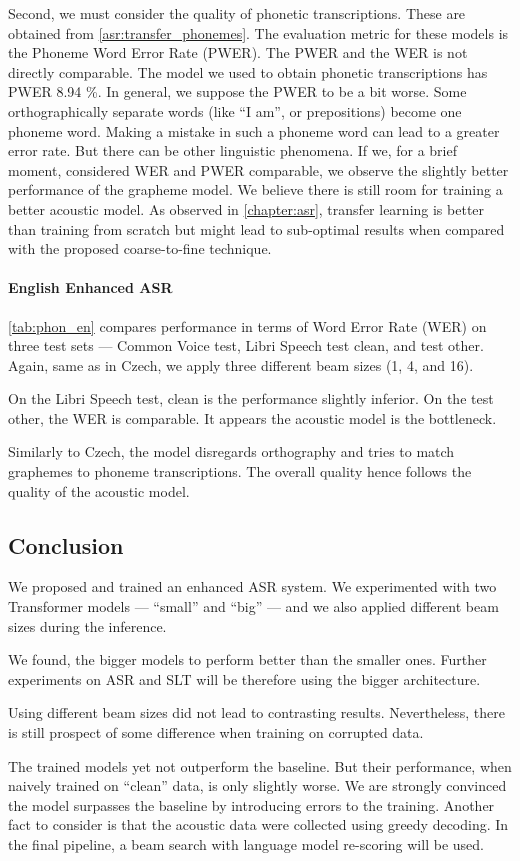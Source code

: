 Second, we must consider the quality of phonetic transcriptions. These are obtained from \cref{asr:transfer_phonemes}. The evaluation metric for these models is the Phoneme Word Error Rate (PWER). The PWER and the WER is not directly comparable. The model we used to obtain phonetic transcriptions has PWER 8.94 \%. In general, we suppose the PWER to be a bit worse. Some orthographically separate words (like ``I am'', or prepositions) become one phoneme word. Making a mistake in such a phoneme word can lead to a greater error rate. But there can be other linguistic phenomena. If we, for a brief moment, considered WER and PWER comparable, we observe the slightly better performance of the grapheme model. We believe there is still room for training a better acoustic model. As observed in \cref{chapter:asr}, transfer learning is better than training from scratch but might lead to sub-optimal results when compared with the proposed coarse-to-fine technique. 

\paragraph{English Enhanced ASR}
\cref{tab:phon_en} compares performance in terms of Word Error Rate (WER) on three test sets --- Common Voice test, Libri Speech test clean, and test other. Again, same as in Czech, we apply three different beam sizes (1, 4, and 16).

On the Libri Speech test, clean is the performance slightly inferior. On the test other, the WER is comparable. It appears the acoustic model is the bottleneck. 

Similarly to Czech, the model disregards orthography and tries to match graphemes to phoneme transcriptions. The overall quality hence follows the quality of the acoustic model.

\subsection{Conclusion}
\label{easr:conclusion}
We proposed and trained an enhanced ASR system. We experimented with two Transformer models --- ``small'' and ``big'' --- and we also applied different beam sizes during the inference. 

We found, the bigger models to perform better than the smaller ones. Further experiments on ASR and SLT will be therefore using the bigger architecture.

Using different beam sizes did not lead to contrasting results. Nevertheless, there is still prospect of some difference when training on corrupted data.

The trained models yet not outperform the baseline. But their performance, when naively trained on ``clean'' data, is only slightly worse. We are strongly convinced the model surpasses the baseline by introducing errors to the training. Another fact to consider is that the acoustic data were collected using greedy decoding. In the final pipeline, a beam search with language model re-scoring will be used. 
